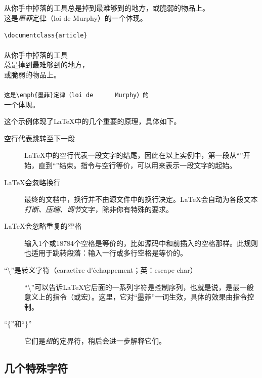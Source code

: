 \begin{codelist}[1.1]{
    从你手中掉落的工具总是掉到最难够到的地方，或脆弱的物品上。\\
    这是\emph{墨菲}定律（loi de Murphy）的一个体现。
}  \begin{dmd}
    \verb+\documentclass{article}+\\
    \verb++\\
    从你手中掉落的工具\\
    总是掉到最难够到的地方，\\
    或脆弱的物品上。\\
    ~\\
    \verb+这是\emph{墨菲}定律（loi de      Murphy）的+\\
    一个体现。\\
    \verb++
\end{dmd}
\end{codelist}

这个示例体现了\LaTeX 中的几个重要的原理，具体如下。

\begin{description}


\item[空行代表跳转至下一段] \LaTeX 中的空行代表一段文字的结尾，因此在以上实例中，第一段从“”开始，直到“”结束。指令与空行等价，可以用来表示一段文字的起始。

\item[\LaTeX 会忽略换行]最终的文档中，换行并不由源文件中的换行决定。\LaTeX 会自动为各段文本\textit{打断、压缩、调节}文字，除非你有特殊的要求。

\item[\LaTeX 会忽略重复的空格]输入1个或18784个空格是等价的，比如源码中和前插入的空格那样。此规则也适用于跳转段落：输入一行或多行空格是等价的。

\item[“\backslash ”是转义字符（caractère d’échappement；英：escape char）]“\backslash ”可以告诉\LaTeX 它后面的一系列字符是控制序列，也就是说，是最一般意义上的指令（或宏）。这里，它对“墨菲”一词生效，具体的效果由指令控制。

\item[“\{”和“\}”]它们是\textit{组}的定界符，稍后会进一步解释它们。

\end{description}

\subsection{几个特殊字符}

